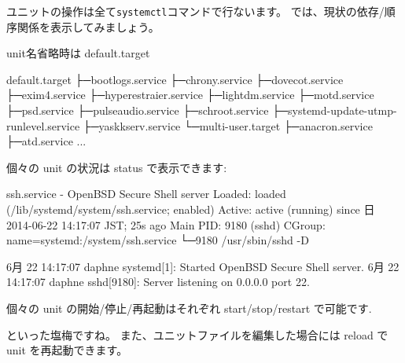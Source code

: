 \documentclass[mingoth,a4paper]{jsarticle}
\begin{document}
ユニットの操作は全て\texttt{systemctl}コマンドで行ないます。
では、現状の依存/順序関係を表示してみましょう。
\begin{commandline}
    unit名省略時は default.target
\end{commandline}
\begin{commandline}
default.target
├─bootlogs.service
├─chrony.service
├─dovecot.service
├─exim4.service
├─hyperestraier.service
├─lightdm.service
├─motd.service
├─psd.service
├─pulseaudio.service
├─schroot.service
├─systemd-update-utmp-runlevel.service
├─yaskkserv.service
└─multi-user.target
  ├─anacron.service
  ├─atd.service
   ...
\end{commandline}
個々の unit の状況は status で表示できます:
\begin{commandline}
ssh.service - OpenBSD Secure Shell server
   Loaded: loaded (/lib/systemd/system/ssh.service; enabled)
   Active: active (running) since 日 2014-06-22 14:17:07 JST; 25s ago
 Main PID: 9180 (sshd)
   CGroup: name=systemd:/system/ssh.service
           └─9180 /usr/sbin/sshd -D

 6月 22 14:17:07 daphne systemd[1]: Started OpenBSD Secure Shell server.
 6月 22 14:17:07 daphne sshd[9180]: Server listening on 0.0.0.0 port 22.
\end{commandline}

個々の unit の開始/停止/再起動はそれぞれ
start/stop/restart で可能です.
といった塩梅ですね。
また、ユニットファイルを編集した場合には reload で unit を再起動できます。
\end{document}
